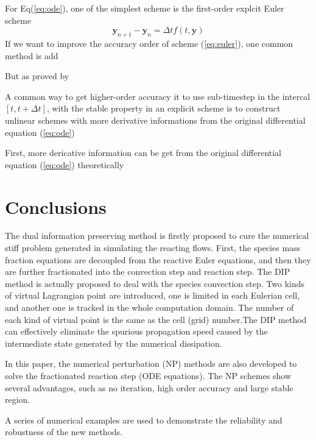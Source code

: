 \documentclass[review]{elsarticle}
\theoremstyle{plain}\newtheorem{definition}{\sc{Definition}}
\theoremstyle{defination}\newtheorem{example}{Example}[section]
\numberwithin{equation}{section}
\numberwithin{table}{section}
\begin{document}
{For Eq(\ref{eq:ode}), one of  the simplest scheme is the first-order explcit Euler scheme  
\begin{equation}\label{eq:euler}
  \bm{y}_{n+1}- \bm{y}_n = \Delta t f(t,\bm{y})
\end{equation}
If we want to improve the accuracy order of scheme (\ref{eq:euler}),  one common method is add 

But as proved by  

A common way to get higher-order accuracy it to use sub-timestep in the intercal $[t,t+\Delta t]$,    with the stable property in an explicit scheme  is to construct unlinear schemes with more derivative informations from the original differential equation (\ref{eq:ode}) 

First, more dericative information can be get from the original differential equation (\ref{eq:ode}) theoretically 








   



\section{Conclusions}

The dual information preserving method is firstly proposed to cure the numerical stiff problem generated in simulating the reacting flows. First, the species mass fraction equations are decoupled from the reactive Euler equations, and then they are further fractionated into the convection step and reaction step. The DIP method is actually proposed to deal with the species convection step. Two kinds of virtual Lagrangian point are introduced, one is limited in each Eulerian cell, and another one is tracked in the whole computation domain. The number of each kind of virtual point is the same as the cell (grid) number.The DIP method can effectively eliminate the spurious propagation speed caused by the intermediate state generated by the numerical dissipation.

In this paper, the numerical perturbation (NP) methods are also developed to solve the fractionated reaction step (ODE equations). The NP schemes show several advantages, such as no iteration, high order accuracy and large stable region.  

A series of numerical examples are used to demonstrate the reliability and robustness of the new methods.

}
\end{document}
